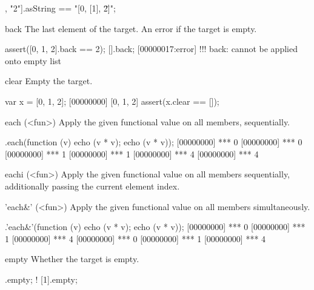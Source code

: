 \begin{urbiscriptapi}
\begin{urbiassert}
[0, [1], "2"].asString == "[0, [1], \"2\"]";
\end{urbiassert}

\item[back]
  The last element of the target. An error if the target is empty.

\begin{urbiscript}
assert([0, 1, 2].back == 2);
[].back;
[00000017:error] !!! back: cannot be applied onto empty list
\end{urbiscript}

\item[clear]
  Empty the target.

\begin{urbiscript}
var x = [0, 1, 2];
[00000000] [0, 1, 2]
assert(x.clear == []);
\end{urbiscript}

\item[each](<fun>)
  Apply the given functional value  on all members,
  sequentially.

\begin{urbiscript}
[0, 1, 2].each(function (v) {echo (v * v); echo (v * v)});
[00000000] *** 0
[00000000] *** 0
[00000000] *** 1
[00000000] *** 1
[00000000] *** 4
[00000000] *** 4
\end{urbiscript}

\item[eachi](<fun>)
  Apply the given functional value  on all members
  sequentially, additionally passing the current element index.


\item['each&'](<fun>)%
Apply the given functional value on all members simultaneously.

\begin{urbiscript}
[0, 1, 2].'each&'(function (v) {echo (v * v); echo (v * v)});
[00000000] *** 0
[00000000] *** 1
[00000000] *** 4
[00000000] *** 0
[00000000] *** 1
[00000000] *** 4
\end{urbiscript}

\item[empty]
  Whether the target is empty.

\begin{urbiassert}
   [].empty;
! [1].empty;
\end{urbiassert}


\end{urbiscriptapi}
